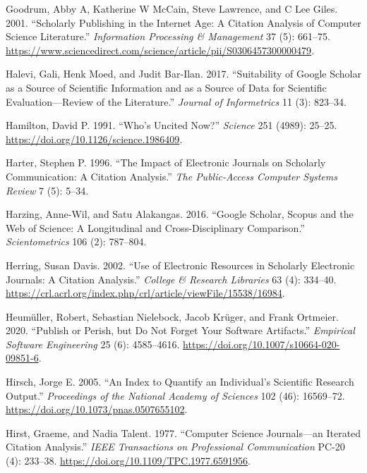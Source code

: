 \documentclass{article}
\begin{document}
\leavevmode\hypertarget{ref-goodrum01:scholarly}{}%
Goodrum, Abby A, Katherine W McCain, Steve Lawrence, and C Lee Giles. 2001. ``Scholarly Publishing in the Internet Age: A Citation Analysis of Computer Science Literature.'' \emph{Information Processing \& Management} 37 (5): 661--75. \url{https://www.sciencedirect.com/science/article/pii/S0306457300000479}.

\leavevmode\hypertarget{ref-halevi17:suitability}{}%
Halevi, Gali, Henk Moed, and Judit Bar-Ilan. 2017. ``Suitability of Google Scholar as a Source of Scientific Information and as a Source of Data for Scientific Evaluation---Review of the Literature.'' \emph{Journal of Informetrics} 11 (3): 823--34.

\leavevmode\hypertarget{ref-hamilton91:uncited}{}%
Hamilton, David P. 1991. ``Who's Uncited Now?'' \emph{Science} 251 (4989): 25--25. \url{https://doi.org/10.1126/science.1986409}.

\leavevmode\hypertarget{ref-harter96:impact}{}%
Harter, Stephen P. 1996. ``The Impact of Electronic Journals on Scholarly Communication: A Citation Analysis.'' \emph{The Public-Access Computer Systems Review} 7 (5): 5--34.

\leavevmode\hypertarget{ref-harzing16:google}{}%
Harzing, Anne-Wil, and Satu Alakangas. 2016. ``Google Scholar, Scopus and the Web of Science: A Longitudinal and Cross-Disciplinary Comparison.'' \emph{Scientometrics} 106 (2): 787--804.

\leavevmode\hypertarget{ref-herring02:use}{}%
Herring, Susan Davis. 2002. ``Use of Electronic Resources in Scholarly Electronic Journals: A Citation Analysis.'' \emph{College \& Research Libraries} 63 (4): 334--40. \url{https://crl.acrl.org/index.php/crl/article/viewFile/15538/16984}.

\leavevmode\hypertarget{ref-heumuller20:publish}{}%
Heumüller, Robert, Sebastian Nielebock, Jacob Krüger, and Frank Ortmeier. 2020. ``Publish or Perish, but Do Not Forget Your Software Artifacts.'' \emph{Empirical Software Engineering} 25 (6): 4585--4616. \url{https://doi.org/10.1007/s10664-020-09851-6}.

\leavevmode\hypertarget{ref-hirsch05:index}{}%
Hirsch, Jorge E. 2005. ``An Index to Quantify an Individual's Scientific Research Output.'' \emph{Proceedings of the National Academy of Sciences} 102 (46): 16569--72. \url{https://doi.org/10.1073/pnas.0507655102}.

\leavevmode\hypertarget{ref-hirst77:computer}{}%
Hirst, Graeme, and Nadia Talent. 1977. ``Computer Science Journals---an Iterated Citation Analysis.'' \emph{IEEE Transactions on Professional Communication} PC-20 (4): 233--38. \url{https://doi.org/10.1109/TPC.1977.6591956}.
\end{document}
